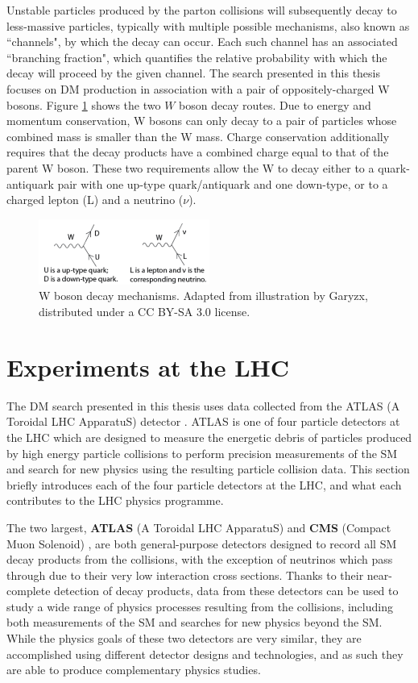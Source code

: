 Unstable particles produced by the parton collisions will subsequently decay to less-massive particles, typically with multiple possible mechanisms, also known as ``channels", by which the decay can occur. Each such channel has an associated ``branching fraction", which quantifies the relative probability with which the decay will proceed by the given channel. The search presented in this thesis focuses on DM production in association with a pair of oppositely-charged W bosons. Figure \ref{fig:W_decays} shows the two $W$ boson decay routes. Due to energy and momentum conservation, W bosons can only decay to a pair of particles whose combined mass is smaller than the W mass. Charge conservation additionally requires that the decay products have a combined charge equal to that of the parent W boson. These two requirements allow the W to decay either to a quark-antiquark pair with one up-type quark/antiquark and one down-type, or to a charged lepton (L) and a neutrino ($\nu$).

\begin{figure}[H]
	\centering
	\includegraphics[width=0.5\textwidth]{Figures/3/W_decays.png}
	\caption[]{W boson decay mechanisms. Adapted from illustration by Garyzx, distributed under a CC BY-SA 3.0 license.}
	\label{fig:W_decays}
\end{figure}

\section{Experiments at the LHC}

The DM search presented in this thesis uses data collected from the ATLAS (A Toroidal LHC ApparatuS) detector \cite{atlas}. ATLAS is one of four particle detectors at the LHC which are designed to measure the energetic debris of particles produced by high energy particle collisions to perform precision measurements of the SM and search for new physics using the resulting particle collision data. This section briefly introduces each of the four particle detectors at the LHC, and what each contributes to the LHC physics programme.

The two largest, \textbf{ATLAS} (A Toroidal LHC ApparatuS) \cite{atlas} and \textbf{CMS} (Compact Muon Solenoid) \cite{cms}, are both general-purpose detectors designed to record all SM decay products from the collisions, with the exception of neutrinos which pass through due to their very low interaction cross sections. Thanks to their near-complete detection of decay products, data from these detectors can be used to study a wide range of physics processes resulting from the collisions, including both measurements of the SM and searches for new physics beyond the SM. While the physics goals of these two detectors are very similar, they are accomplished using different detector designs and technologies, and as such they are able to produce complementary physics studies.

